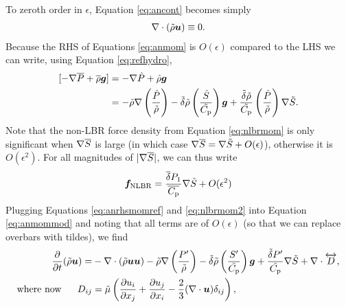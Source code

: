 \documentclass[12pt]{article}
\begin{document}
To zeroth order in $\epsilon$, Equation \eqref{eq:ancont} becomes simply
\begin{align}\label{eq:ancontref}
	\nabla\cdot(\tilde{\rho}\bm{u})\equiv0.
\end{align}
Because the RHS of Equations \eqref{eq:anmom} is $O(\epsilon)$ compared to the LHS we can write, using Equation \eqref{eq:refhydro},
\begin{align}\label{eq:anrhsmomref}
	[-\nabla \overline{P} + \overline{\rho}\bm{g}] &= -\nabla \hat{P} + \hat{\rho}\bm{g}\nonumber\\
	&= -\tilde{\rho}\nabla\left(\frac{\hat{P}}{\tilde{\rho}}\right) - \tilde{\delta} \tilde{\rho} \left(\frac{\hat{S}}{\tilde{C_{\rm{p}}}}\right) \bm{g} + \frac{\tilde{\delta}\tilde{\rho}}{\tilde{C_{\rm{p}}}} \left(\frac{\hat{P}}{\tilde{\rho}}\right)\nabla\tilde{S}.
\end{align}
Note that the non-LBR force density from Equation \eqref{eq:nlbrmom} is only significant when $\nabla\overline{S}$ is large (in which case $\nabla\overline{S}=\nabla\tilde{S}+O(\epsilon)$), otherwise it is $O(\epsilon^2)$. For all magnitudes of $|\nabla\overline{S}|$, we can thus write
\begin{align}\label{eq:nlbrmom2}
	\bm{f}_{\rm NLBR} = \frac{\overline{\delta} P_1}{\overline{C_{\rm{p}}}} \nabla\tilde{S} + O(\epsilon^2)
\end{align}
Plugging Equations \eqref{eq:anrhsmomref} and \eqref{eq:nlbrmom2} into Equation \eqref{eq:anmommod} and noting that all terms are of $O(\epsilon)$ (so that we can replace overbars with tildes), we find
\begin{subequations}\label{eq:anmomref}
	\begin{align}\label{eq:anmomrefmain}
	\frac{\partial}{\partial t}(\tilde{\rho}\bm{u})= &-\nabla\cdot(\tilde{\rho}\bm{u}\bm{u}) -\tilde{\rho}\nabla\left(\frac{P^\prime}{\tilde{\rho}}\right) - \tilde{\delta}\tilde{\rho} \left(\frac{S^\prime}{\tilde{C_{\rm{p}}}}\right) \bm{g} +\frac{\tilde{\delta} P^\prime}{\tilde{C_{\rm{p}}}} \nabla\tilde{S}+\nabla\cdot \overleftrightarrow{D},\\
	\text{where now}\ \ \ \ \  D_{ij}& = \tilde{\mu}\left(\frac{\partial u_i}{\partial x_j} + \frac{\partial u_j}{\partial x_i} - \frac{2}{3}(\nabla\cdot\bm{u})\delta_{ij}\right)\label{eq:anmomrefvisc},
\end{align}
\end{subequations}
\end{document}
